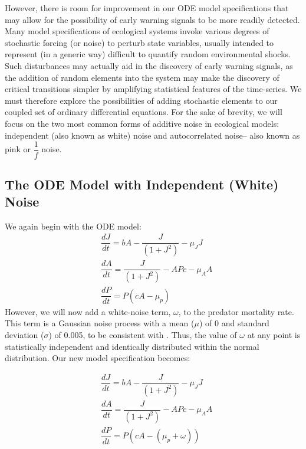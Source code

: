 \documentclass[12pt]{article}
\begin{document}
However, there is room for improvement in our ODE model specifications that may allow for the possibility of early warning signals to be more readily detected. Many model specifications of ecological systems invoke various degrees of stochastic forcing (or noise) to perturb state variables, usually intended to represent (in a generic way) difficult to quantify random environmental shocks. Such disturbances may actually aid in the discovery of early warning signals, as the addition of random elements into the system may make the discovery of critical transitions simpler by amplifying statistical features of the time-series. We must therefore explore the possibilities of adding stochastic elements to our coupled set of ordinary differential equations. For the sake of brevity, we will focus on the two most common forms of additive noise in ecological models: independent (also known as white) noise and autocorrelated noise-- also known as pink or $\dfrac{1}{f}$ noise. 


\subsection{The ODE Model with Independent (White) Noise}

We again begin with the ODE model:
\begin{align}
	& \dfrac{dJ}{dt} = bA - \dfrac{J}{(1+J^2)} - \mu_JJ\\
	& \dfrac{dA}{dt} = \dfrac{J}{(1+J^2)} - APc - \mu_AA\\
	& \dfrac{dP}{dt} = P(cA - \mu_p)
\end{align}
However, we will now add a white-noise term, $\omega$, to the predator mortality rate. This term is a Gaussian noise process with a mean ($\mu$) of 0 and standard deviation ($\sigma$) of 0.005, to be consistent with \cite{Boerlijst2013}. Thus, the value of $\omega$ at any point is statistically independent and identically distributed within the normal distribution. Our new model specification becomes:

\begin{align}
	& \dfrac{dJ}{dt} = bA - \dfrac{J}{(1+J^2)} - \mu_JJ\\
	& \dfrac{dA}{dt} = \dfrac{J}{(1+J^2)} - APc - \mu_AA\\
	& \dfrac{dP}{dt} = P(cA - (\mu_p+\omega))
\end{align}
\end{document}
